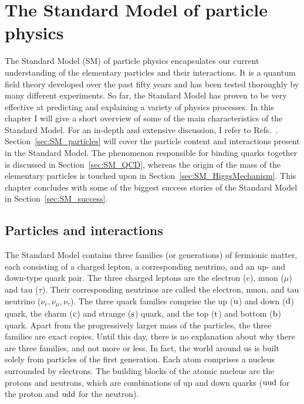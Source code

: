 \chapter{The Standard Model of particle physics \label{chap:standard_model}}

The Standard Model (SM) of particle physics encapsulates our current understanding of the elementary
particles and their interactions. 
It is a quantum field theory developed over the past fifty years and has been tested thoroughly
by many different experiments. So far, the Standard Model has proven to be very effective at
predicting and explaining a variety of physics processes. 
In this chapter I will give a short overview of some of the main characteristics of the Standard
Model. For an in-depth and extensive discussion, I refer to
Refs.~\cite{Povh:1995mua,bettini2014introduction,Peskin:1995ev,Burgess:2007zi,Agashe:2014kda}.
Section~\ref{sec:SM_particles} will cover the particle content and interactions
present in the Standard Model. 
The phenomenon responsible for binding quarks together is discussed in Section~\ref{sec:SM_QCD},
whereas the origin of the mass of the elementary particles is touched upon in
Section~\ref{sec:SM_HiggsMechanism}. 
This chapter concludes with some of the biggest success stories of the Standard Model in
Section~\ref{sec:SM_success}.

\section{Particles and interactions \label{sec:SM_particles}}

The Standard Model contains three families (or generations) of fermionic matter, each consisting of
a charged lepton, a corresponding neutrino, and an up- and down-type quark pair.
The three charged leptons are the electron ($e$), muon ($\mu$) and tau ($\tau$). Their corresponding
neutrinos are called the electron, muon, and tau neutrino ($\nu_e, \nu_\mu, \nu_\tau$). 
The three quark families comprise the up ($\mathrm{u}$) and down ($\mathrm{d}$) quark, the charm
($\mathrm{c}$) and strange ($\mathrm{s}$) quark, and the top ($\mathrm{t}$) and bottom ($\mathrm{b}$) quark.
Apart from the progressively larger mass of the particles, the three families are exact copies.
Until this day, there is no explanation about why there are three families, and not more or less. 
In fact, the world around us is built solely from particles of the first generation. 
Each atom comprises a nucleus surrounded by electrons. 
The building blocks of the atomic nucleus are the protons and neutrons, which are combinations of up
and down quarks ($\mathrm{u}\mathrm{u}\mathrm{d}$ for the proton and $\mathrm{u}\mathrm{d}\mathrm{d}$ for the neutron).

